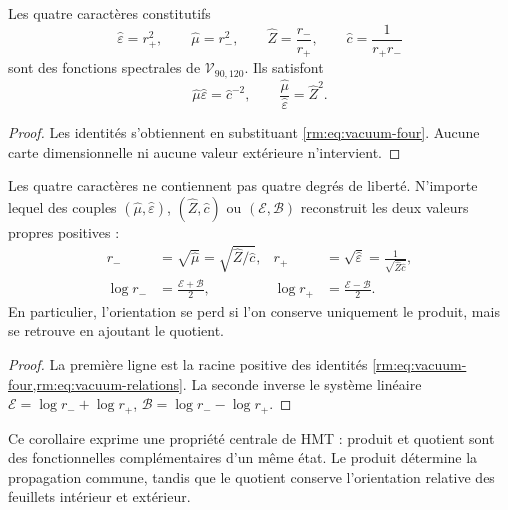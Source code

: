 \begin{theorem}
Les quatre caractères constitutifs
\begin{equation}
\widehat\varepsilon=r_+^2,\qquad
\widehat\mu=r_-^2,\qquad
\widehat Z=\frac{r_-}{r_+},\qquad
\widehat c=\frac1{r_+r_-}
\label{rm:eq:vacuum-four}
\end{equation}
sont des fonctions spectrales de \(\mathcal V_{90,120}\). Ils satisfont
\begin{equation}
\widehat\mu\widehat\varepsilon=\widehat c^{-2},
\qquad
\frac{\widehat\mu}{\widehat\varepsilon}=\widehat Z^2.
\label{rm:eq:vacuum-relations}
\end{equation}
\end{theorem}

\begin{proof}
Les identités s'obtiennent en substituant \cref{rm:eq:vacuum-four}. Aucune carte dimensionnelle ni aucune valeur extérieure n'intervient.
\end{proof}

\begin{corollary}
Les quatre caractères ne contiennent pas quatre degrés de liberté. N'importe lequel
des couples \((\widehat\mu,\widehat\varepsilon)\),
\((\widehat Z,\widehat c)\) ou \((\mathcal E,\mathcal B)\) reconstruit les
deux valeurs propres positives :
\begin{align}
r_-&=\sqrt{\widehat\mu}
=\sqrt{\widehat Z/\widehat c},
&r_+&=\sqrt{\widehat\varepsilon}
=\frac1{\sqrt{\widehat Z\widehat c}},
\label{rm:eq:vacuum-reconstruct-r}\\
\log r_-&=\frac{\mathcal E+\mathcal B}{2},
&\log r_+&=\frac{\mathcal E-\mathcal B}{2}.
\label{rm:eq:vacuum-reconstruct-log}
\end{align}
En particulier, l'orientation se perd si l'on conserve uniquement le produit,
mais se retrouve en ajoutant le quotient.
\end{corollary}

\begin{proof}
La première ligne est la racine positive des identités
\cref{rm:eq:vacuum-four,rm:eq:vacuum-relations}. La seconde inverse le système
linéaire
\(\mathcal E=\log r_-+\log r_+\),
\(\mathcal B=\log r_--\log r_+\).
\end{proof}

Ce corollaire exprime une propriété centrale de HMT : produit et quotient sont
des fonctionnelles complémentaires d'un même état. Le produit détermine la
propagation commune, tandis que le quotient conserve l'orientation
relative des feuillets intérieur et extérieur.


